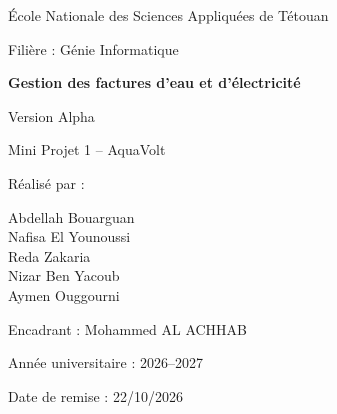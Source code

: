 \documentclass[10pt,a4paper]{article}
\newcommand{\projecttitle}{Gestion des factures d'eau et d'électricité}
\newcommand{\projectversion}{Version Alpha}
\newcommand{\projectname}{AquaVolt}
\begin{document}
\begin{titlepage}
  \centering
  {\large École Nationale des Sciences Appliquées de Tétouan\par}
  {\large Filière : Génie Informatique\par}
  \vspace{2.2cm}

  {\Huge\bfseries \projecttitle\par}
  \vspace{0.5cm}
  {\LARGE \projectversion\par}
  \vspace{0.3cm}
  {\large Mini Projet 1 -- \projectname\par}

  \vspace{2.2cm}
  {\large Réalisé par :\par}
  \vspace{0.3cm}
  {\large
    Abdellah Bouarguan\\
    Nafisa El Younoussi\\
    Reda Zakaria\\
    Nizar Ben Yacoub\\
    Aymen Ouggourni\par
  }

  \vfill
  {\large Encadrant : Mohammed AL ACHHAB\par}
  \vspace{0.3cm}
  {\large Année universitaire : 2026--2027\par}
  {\large Date de remise : 22/10/2026\par}
\end{titlepage}





\setcounter{tocdepth}{1}
\tableofcontents

\clearpage
{}


\clearpage














\end{document}
